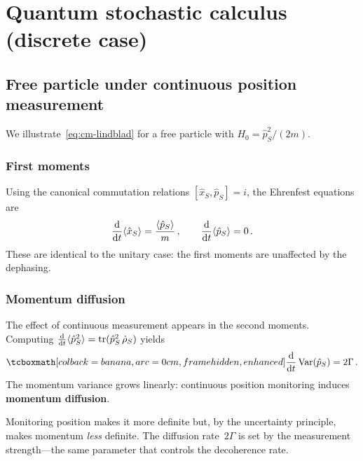 \section{Quantum stochastic calculus (discrete case)}%
\label{sec:quantum-stochastic-discrete}

\subsection{Free particle under continuous position measurement}%
\label{sec:free-particle}

We illustrate~\eqref{eq:cm-lindblad} for a free particle with
$H_0 = \hat{p}_S^2/(2m)$.

\subsubsection{First moments}

Using the canonical commutation relations
$[\hat{x}_S, \hat{p}_S] = i$, the Ehrenfest equations are
\begin{equation}\label{eq:ehrenfest-free}
  \frac{\mathrm{d}}{\mathrm{d} t}\langle \hat{x}_S \rangle
  = \frac{\langle \hat{p}_S \rangle}{m}\,,
  \qquad
  \frac{\mathrm{d}}{\mathrm{d} t}\langle \hat{p}_S \rangle = 0\,.
\end{equation}
These are identical to the unitary case: the first moments are
unaffected by the dephasing.

\subsubsection{Momentum diffusion}

The effect of continuous measurement appears in the second moments.
Computing
$\frac{\mathrm{d}}{\mathrm{d} t}\langle \hat{p}_S^2 \rangle
= \operatorname{tr}(\hat{p}_S^2\,\dot{\rho}_S)$ yields
\begin{equation}\label{eq:mom-var}
  \eqbox{\frac{\dd}{\dd t}\,\mathrm{Var}(\hat{p}_S) = 2\Gamma}\,.
\end{equation}
The momentum variance grows linearly: continuous position monitoring
induces \textbf{momentum diffusion}.

\begin{keyresult}
  Monitoring position makes it more definite but, by the uncertainty
  principle, makes momentum \emph{less} definite.  The diffusion
  rate~$2\Gamma$ is set by the measurement strength---the same
  parameter that controls the decoherence rate.
\end{keyresult}

